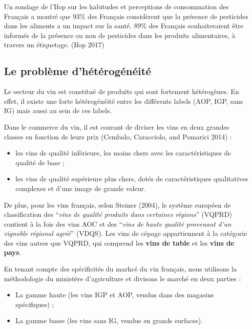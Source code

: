 \documentclass[11pt,]{article}
\providecommand{\tightlist}{%
  \setlength{\itemsep}{0pt}\setlength{\parskip}{0pt}}
\begin{document}
Un sondage de l'Ifop sur les habitudes et perceptions de consommation
des Français a montré que 93\% des Français considèrent que la présence
de pesticides dans les aliments a un impact sur la santé. 89\% des
Français souhaiteraient être informés de la présence ou non de
pesticides dans les produits alimentaires, à travers un étiquetage.
(Ifop 2017)

\hypertarget{le-probleme-dheterogeneite}{%
\subsection{Le problème
d'hétérogénéité}\label{le-probleme-dheterogeneite}}

Le secteur du vin est constitué de produits qui sont fortement
hétérogènes. En effet, il existe une forte hétérogénéité entre les
différents labels (AOP, IGP, sans IG) mais aussi au sein de ces labels.

Dans le commerce du vin, il est courant de diviser les vins en deux
grandes classes en fonction de leurs prix (Cembalo, Caracciolo, and
Pomarici 2014) :

\begin{itemize}
\tightlist
\item
  les vins de qualité inférieure, les moins chers avec les
  caractéristiques de qualité de base ;
\item
  les vins de qualité supérieure plus chers, dotés de caractéristiques
  qualitatives complexes et d'une image de grande valeur.
\end{itemize}

De plus, pour les vins français, selon Steiner (2004), le système
européen de classification des ``\emph{vins de qualité produits dans
certaines régions}'' (VQPRD) contient à la fois des vins AOC et des
``\emph{vins de haute qualité provenant d'un vignoble régional agréé}''
(VDQS). Les vins de cépage appartiennent à la catégorie des vins autres
que VQPRD, qui comprend les \textbf{vins de table} et les
\textbf{vins de pays}.

En tenant compte des spécificités du marhcé du vin français, nous
utilisons la méthodologie du ministère d'agriculture et divisons le
marché en deux parties :

\begin{itemize}
\tightlist
\item
  La gamme haute (les vins IGP et AOP, vendus dans des magasins
  spécifiques) ;
\item
  La gamme basse (les vins sans IG, vendus en grands surfaces).
\end{itemize}
\end{document}
